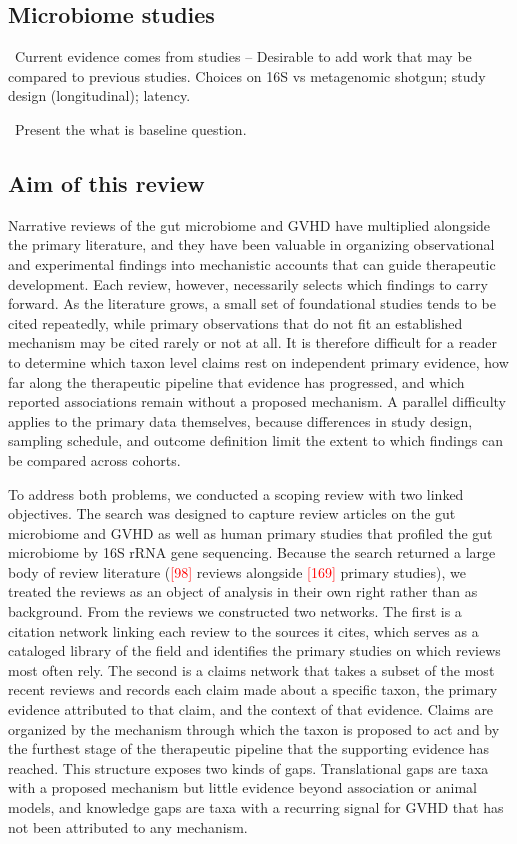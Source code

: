 \documentclass[11pt,a4paper]{article}
\newcommand{\todoitem}[1]{\par\noindent\textcolor{blue!70!black}{\textbullet~#1}}
\newcommand{\ph}[1]{\textcolor{red}{[#1]}}  %
\begin{document}
\subsection*{Microbiome studies}
\todoitem{Current evidence comes from studies -- Desirable to add work that may be compared to previous studies. Choices on 16S vs metagenomic shotgun; study design (longitudinal); latency.}
\todoitem{Present the what is baseline question.}


\subsection*{Aim of this review}

Narrative reviews of the gut microbiome and GVHD have multiplied alongside the primary literature, and they have been valuable in organizing observational and experimental findings into mechanistic accounts that can guide therapeutic development. Each review, however, necessarily selects which findings to carry forward. As the literature grows, a small set of foundational studies tends to be cited repeatedly, while primary observations that do not fit an established mechanism may be cited rarely or not at all. It is therefore difficult for a reader to determine which taxon level claims rest on independent primary evidence, how far along the therapeutic pipeline that evidence has progressed, and which reported associations remain without a proposed mechanism. A parallel difficulty applies to the primary data themselves, because differences in study design, sampling schedule, and outcome definition limit the extent to which findings can be compared across cohorts.

To address both problems, we conducted a scoping review with two linked objectives. The search was designed to capture review articles on the gut microbiome and GVHD as well as human primary studies that profiled the gut microbiome by 16S rRNA gene sequencing. Because the search returned a large body of review literature (\ph{98} reviews alongside \ph{169} primary studies), we treated the reviews as an object of analysis in their own right rather than as background. From the reviews we constructed two networks. The first is a citation network linking each review to the sources it cites, which serves as a cataloged library of the field and identifies the primary studies on which reviews most often rely. The second is a claims network that takes a subset of the most recent reviews and records each claim made about a specific taxon, the primary evidence attributed to that claim, and the context of that evidence. Claims are organized by the mechanism through which the taxon is proposed to act and by the furthest stage of the therapeutic pipeline that the supporting evidence has reached. This structure exposes two kinds of gaps. Translational gaps are taxa with a proposed mechanism but little evidence beyond association or animal models, and knowledge gaps are taxa with a recurring signal for GVHD that has not been attributed to any mechanism.
\end{document}
